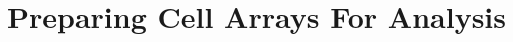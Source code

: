 \chapter[Preparing Cell Arrays For Analysis]{Preparing Cell Arrays For Analysis}
\label{cp:preparing-cell-arrays-for-analysis}
